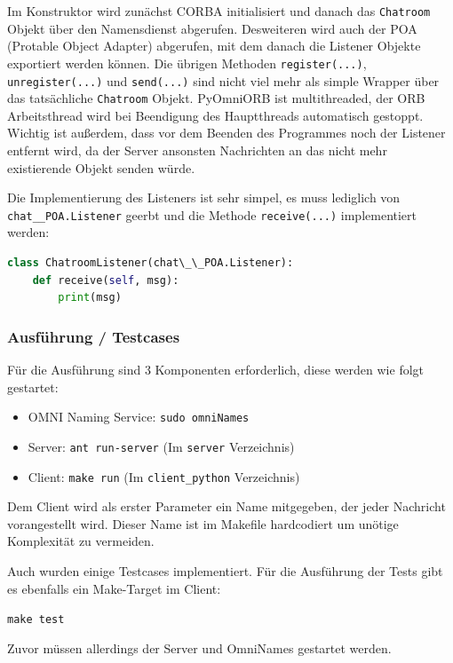 Im Konstruktor wird zun\"achst CORBA initialisiert und danach das \texttt{Chatroom} Objekt \"uber den Namensdienst abgerufen.
Desweiteren wird auch der POA (Protable Object Adapter) abgerufen, mit dem danach die Listener Objekte exportiert werden k\"onnen.
Die \"ubrigen Methoden \texttt{register(...)}, \texttt{unregister(...)} und \texttt{send(...)} sind nicht viel mehr als simple Wrapper \"uber das tats\"achliche \texttt{Chatroom} Objekt.
PyOmniORB ist multithreaded, der ORB Arbeitsthread wird bei Beendigung des Hauptthreads automatisch gestoppt.
Wichtig ist au\ss erdem, dass vor dem Beenden des Programmes noch der Listener entfernt wird, da der Server ansonsten Nachrichten an das nicht mehr existierende Objekt senden w\"urde.

Die Implementierung des Listeners ist sehr simpel, es muss lediglich von \texttt{chat\_\_POA.Listener} geerbt und die Methode \texttt{receive(...)} implementiert werden:

\begin{lstlisting}[language={Python}, caption=Simple Nachrichten Listener Implementierung ]
class ChatroomListener(chat\_\_POA.Listener):
    def receive(self, msg):
        print(msg)
\end{lstlisting}

\subsubsection{Ausf\"uhrung / Testcases}
F\"ur die Ausf\"uhrung sind 3 Komponenten erforderlich, diese werden wie folgt gestartet:
\begin{itemize}
    \item OMNI Naming Service: \texttt{sudo omniNames}
    \item Server: \texttt{ant run-server} (Im \texttt{server} Verzeichnis)
    \item Client: \texttt{make run} (Im \texttt{client\_python} Verzeichnis)
\end{itemize}

Dem Client wird als erster Parameter ein Name mitgegeben, der jeder Nachricht vorangestellt wird.
Dieser Name ist im Makefile hardcodiert um un\"otige Komplexit\"at zu vermeiden.

Auch wurden einige Testcases implementiert.
F\"ur die Ausf\"uhrung der Tests gibt es ebenfalls ein Make-Target im Client:

\texttt{make test}

Zuvor m\"ussen allerdings der Server und OmniNames gestartet werden.

